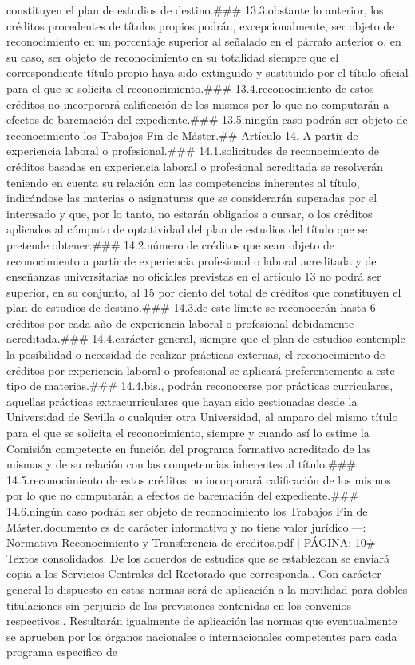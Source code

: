 \documentclass{article}
\begin{document}
\begin{itemize}
{{{{constituyen el plan de estudios de destino.\n\n### 13.3.\nNo obstante lo anterior, los créditos procedentes de títulos propios podrán, excepcionalmente, ser objeto de reconocimiento en un porcentaje superior al señalado en el párrafo anterior o, en su caso, ser objeto de reconocimiento en su totalidad siempre que el correspondiente título propio haya sido extinguido y sustituido por el título oficial para el que se solicita el reconocimiento.\n\n### 13.4.\nEl reconocimiento de estos créditos no incorporará calificación de los mismos por lo que no computarán a efectos de baremación del expediente.\n\n### 13.5.\nEn ningún caso podrán ser objeto de reconocimiento los Trabajos Fin de Máster.\n\n## Artículo 14. A partir de experiencia laboral o profesional.\n\n### 14.1.\nLas solicitudes de reconocimiento de créditos basadas en experiencia laboral o profesional acreditada se resolverán teniendo en cuenta su relación con las competencias inherentes al título, indicándose las materias o asignaturas que se considerarán superadas por el interesado y que, por lo tanto, no estarán obligados a cursar, o los créditos aplicados al cómputo de optatividad del plan de estudios del título que se pretende obtener.\n\n### 14.2.\nEl número de créditos que sean objeto de reconocimiento a partir de experiencia profesional o laboral acreditada y de enseñanzas universitarias no oficiales previstas en el artículo 13 no podrá ser superior, en su conjunto, al 15 por ciento del total de créditos que constituyen el plan de estudios de destino.\n\n### 14.3.\nDentro de este límite se reconocerán hasta 6 créditos por cada año de experiencia laboral o profesional debidamente acreditada.\n\n### 14.4.\nCon carácter general, siempre que el plan de estudios contemple la posibilidad o necesidad de realizar prácticas externas, el reconocimiento de créditos por experiencia laboral o profesional se aplicará preferentemente a este tipo de materias.\n\n### 14.4.bis.\nAsimismo, podrán reconocerse por prácticas curriculares, aquellas prácticas extracurriculares que hayan sido gestionadas desde la Universidad de Sevilla o cualquier otra Universidad, al amparo del mismo título para el que se solicita el reconocimiento, siempre y cuando así lo estime la Comisión competente en función del programa formativo acreditado de las mismas y de su relación con las competencias inherentes al título.\n\n### 14.5.\nEl reconocimiento de estos créditos no incorporará calificación de los mismos por lo que no computarán a efectos de baremación del expediente.\n\n### 14.6.\nEn ningún caso podrán ser objeto de reconocimiento los Trabajos Fin de Máster.\n\nEste documento es de carácter informativo y no tiene valor jurídico.\n\n---\n\nFUENTE: Normativa Reconocimiento y Transferencia de creditos.pdf | PÁGINA: 10\n# Textos consolidados\n{}. De los acuerdos de estudios que se establezcan se enviará copia a los Servicios Centrales del Rectorado que corresponda.. Con carácter general lo dispuesto en estas normas será de aplicación a la movilidad para dobles titulaciones sin perjuicio de las previsiones contenidas en los convenios respectivos.. Resultarán igualmente de aplicación las normas que eventualmente se aprueben por los órganos nacionales o internacionales competentes para cada programa específico de }}}}
\end{itemize}
\end{document}
